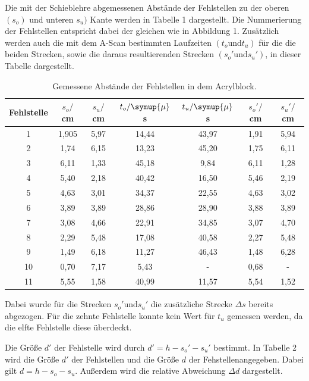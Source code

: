 Die mit der Schieblehre abgemessenen Abstände der Fehlstellen zu der oberen $(s_o)$ und unteren $s_u)$ Kante werden in Tabelle 1 dargestellt. Die Nummerierung der
Fehlstellen entspricht dabei der gleichen wie in Abbildung 1. Zusätzlich werden auch die mit dem A-Scan bestimmten Laufzeiten $(t_o \text{und} t_u)$ für die
die beiden Strecken, sowie die daraus resultierenden Strecken $(s_o' \text{und} s_u')$, in dieser Tabelle dargestellt.
\begin{table}[H]
  \centering
  \caption{Gemessene Abstände der Fehlstellen in dem Acrylblock.}
  \label{tab:spannung1}
  \begin{tabular}{c c c c c c c}
    \toprule
  Fehlstelle & $s_o/$cm & $s_u/$cm & $t_o/\symup{\mu}$s & $t_u/\symup{\mu}$s & $s_o'/$cm & $s_u'/$cm  \\
    \midrule
    1  &  1,905 & 5,97 & 14,44 & 43,97 & 1,91 & 5,94    \\
    2  &  1,74 & 6,15 & 13,23 & 45,20 & 1,75 & 6,11    \\
    3  &  6,11 & 1,33 & 45,18 & 9,84  & 6,11 & 1,28    \\
    4  &  5,40 & 2,18 & 40,42 & 16,50 & 5,46 & 2,19    \\
    5  &  4,63 & 3,01 & 34,37 & 22,55 & 4,63 & 3,02    \\
    6  &  3,89 & 3,89 & 28,86 & 28,90 & 3,88 & 3,89    \\
    7  &  3,08 & 4,66 & 22,91 & 34,85 & 3,07 & 4,70    \\
    8  &  2,29 & 5,48 & 17,08 & 40,58 & 2,27 & 5,48    \\
    9  &  1,49 & 6,18 & 11,27 & 46,43 & 1,48 & 6,28    \\
    10 &  0,70 & 7,17 & 5,43  & -     & 0,68 & -     \\
    11 &  5,55 & 1,58 & 40,99 & 11,57 & 5,54 & 1,52    \\
    \bottomrule
  \end{tabular}
\end{table}

Dabei wurde für die Strecken $s_o' \text{und} s_u'$ die zusätzliche Strecke $\Delta s$ bereits abgezogen. Für die zehnte Fehlstelle konnte
kein Wert für $t_u$ gemessen werden, da die elfte Fehlstelle diese überdeckt.

Die Größe $d'$ der Fehlstelle wird durch $d' = h - s_o' - s_u'$ bestimmt. In Tabelle 2 wird die Größe $d'$ der Fehlstellen und die
Größe $d$ der Fehstellenangegeben. Dabei gilt $d = h - s_o - s_u$. Außerdem wird die relative Abweichung $\Delta d$ dargestellt.

